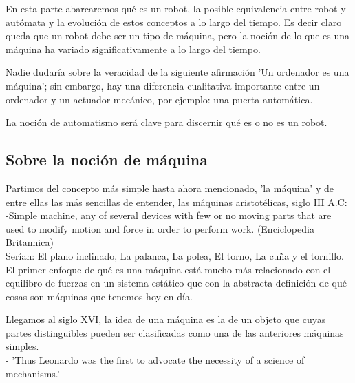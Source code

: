 


En esta parte abarcaremos qué es un robot, la posible equivalencia entre robot y autómata y la evolución de estos conceptos a lo largo del tiempo. Es decir claro queda que un robot debe ser un tipo de máquina, pero la noción de lo que es una máquina ha variado significativamente a lo largo del tiempo. 

\vspace{10px}

Nadie dudaría sobre la veracidad de la siguiente afirmación 'Un ordenador es una máquina'; sin embargo, hay una diferencia cualitativa importante entre un ordenador y un actuador mecánico, por ejemplo: una puerta automática.

\vspace{10px}

La noción de automatismo será clave para discernir qué es o no es un robot. 

\vspace{10px}

\subsection{ Sobre la noción de máquina}


Partimos del concepto más simple hasta ahora mencionado, 'la máquina' y de entre ellas las más sencillas de entender, las máquinas aristotélicas, siglo III A.C: \\

-Simple machine, any of several devices with few or no moving parts that are used to modify motion and force in order to perform work. (Enciclopedia Britannica) \\


Serían: El plano inclinado, La palanca, La polea, El torno, La cuña y el tornillo. El primer enfoque de qué es una máquina está mucho más relacionado con el equilibro de fuerzas en un sistema estático que con la abstracta definición de qué cosas son máquinas que tenemos hoy en día. 

\vspace{10px}

Llegamos al siglo XVI, la idea de una máquina es la de un objeto que cuyas partes distinguibles pueden ser clasificadas como una de las anteriores máquinas simples. \\

- 'Thus Leonardo was the first to advocate the necessity of a science of mechanisms.' -  \\

